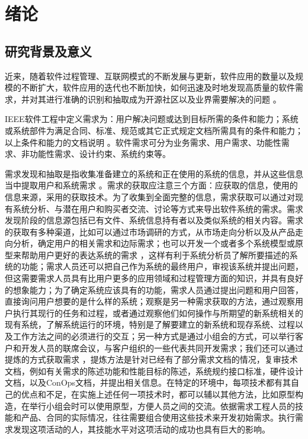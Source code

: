 \chapter{绪论}\label{chap:introduction}

\section{研究背景及意义}

近来，随着软件过程管理、互联网模式的不断发展与更新，软件应用的数量以及规模的不断扩大，软件应用的迭代也不断加快，如何迅速及时地发现高质量的软件需求，并对其进行准确的识别和抽取成为开源社区以及业界需要解决的问题 \cite{Saur2006Review}。


IEEE软件工程中定义需求为：用户解决问题或达到目标所需的条件和能力；系统或系统部件为满足合同、标准、规范或其它正式规定文档所需具有的条件和能力；以上条件和能力的文档说明 \cite{Board2002IEEE}。软件需求可分为业务需求、用户需求、功能性需求、非功能性需求、设计约束、系统约束等。


需求发现和抽取是指收集准备建立的系统和正在使用的系统的信息，并从这些信息当中提取用户和系统需求 \cite{Vlas2011A}。需求的获取应注意三个方面：应获取的信息，使用的信息来源，采用的获取技术。为了收集到全面完整的信息，需求获取可以通过对现有系统分析、与潜在用户和购买者交流、讨论等方式来导出软件系统的需求。需求发现阶段的信息源包括已有文件、系统信息持有者以及类似系统的相关内容。需求的获取有多种渠道，比如可以通过市场调研的方式，从市场走向分析以及从产品走向分析，确定用户的相关需求和边际需求；也可以开发一个或者多个系统模型或原型来帮助用户更好的表达系统的需求 \cite{唐中君基于}，这样有利于系统分析员了解所要描述的系统的功能；需求人员还可以把自己作为系统的最终用户，审视该系统并提出问题，但这需要需求人员具有比用户更多的应用领域和过程管理方面的知识，并具有良好的想象能力；为了确定系统应该具有的功能，需求人员通过提出问题和用户回答，直接询问用户想要的是什么样的系统；观察是另一种需求获取的方法，通过观察用户执行其现行的任务和过程，或者通过观察他们如何操作与所期望的新系统相关的现有系统，了解系统运行的环境，特别是了解要建立的新系统和现存系统、过程以及工作方法之间的必须进行的交互；另一种方式是通过小组会的方式，可以举行客户和开发人员的联席会议，与客户组织的一些代表共同开发需求；我们还可以通过提炼的方式获取需求 \cite{孙挺2002基于}，提炼方法是针对已经有了部分需求文档的情况，复审技术文档，例如有关需求的陈述功能和性能目标的陈述，系统规约接口标准，硬件设计文档，以及ConOps文档，并提出相关信息。在特定的环境中，每项技术都有其自己的优点和不足，在实施上述任何一项技术时，都可以辅以其他方法，比如原型构造，在举行小组会时可以使用原型，方便人员之间的交流。依据需求工程人员的技能和产品、合同的实际情况，往往需要组合使用这些技术来开发初始需求。执行需求发现这项活动的人，其技能水平对这项活动的成功也具有巨大的影响。

